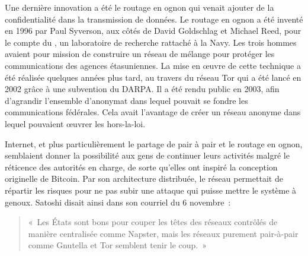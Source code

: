 
Une dernière innovation a été le routage en ognon qui venait ajouter de la confidentialité dans la transmission de données. Le routage en ognon a été inventé en 1996 par Paul Syverson, aux côtés de David Goldschlag et Michael Reed, pour le compte du , un laboratoire de recherche rattaché à la Navy. Les trois hommes avaient pour mission de construire un réseau de mélange pour protéger les communications des agences étasuniennes. La mise en œuvre de cette technique a été réalisée quelques années plus tard, au travers du réseau Tor qui a été lancé en 2002 grâce à une subvention du DARPA. Il a été rendu public en 2003, afin d'agrandir l'ensemble d'anonymat dans lequel pouvait se fondre les communications fédérales. Cela avait l'avantage de créer un réseau anonyme dans lequel pouvaient œuvrer les hors-la-loi.

Internet, et plus particulièrement le partage de pair à pair et le routage en ognon, semblaient donner la possibilité aux gens de continuer leurs activités malgré le réticence des autorités en charge, de sorte qu'elles ont inspiré la conception originelle de Bitcoin. Par son architecture distribuée, le réseau permettait de répartir les risques pour ne pas subir une attaque qui puisse mettre le système à genoux. Satoshi disait ainsi dans son courriel du 6 novembre~:

\begin{quote}
«~Les États sont bons pour couper les têtes des réseaux contrôlés de manière centralisée comme Napster, mais les réseaux purement pair-à-pair comme Gnutella et Tor semblent tenir le coup.~»
\end{quote} %

